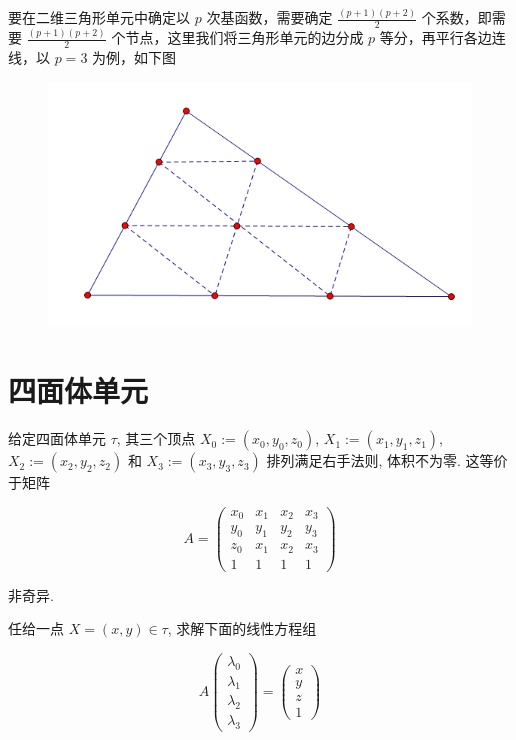 \documentclass[12pt,a4paper]{article}
\begin{document}
要在二维三角形单元中确定以 $p$ 次基函数，需要确定 $\frac{(p+1)(p+2)}{2}$ 个系数，即需要 $\frac{(p+1)(p+2)}{2}$ 个节点，这里我们将三角形单元的边分成 $p$ 等分，再平行各边连线，以 $p=3$ 为例，如下图
\begin{figure}[H]
\centering
\includegraphics[scale=0.7]{./figures/4.png}
\caption{}
\end{figure}



\section{四面体单元}
给定四面体单元 $\tau$, 其三个顶点 $X_0 :=(x_0, y_0,z_0)$, $X_1 :=(x_1,y_1,z_1)$, $X_2 :=(x_2,y_2,z_2)$ 和 $X_3 :=(x_3, y_3, z_3)$ 排列满足右手法则, 体积不为零. 这等价于矩阵

$$
A = 
\begin{pmatrix}
x_0 & x_1 & x_2 & x_3\\
y_0 & y_1 & y_2 & y_3\\
z_0 & x_1 & x_2 & x_3\\
1   & 1   & 1 & 1
\end{pmatrix}
$$

非奇异. 

任给一点 $X=(x,y)\in\tau$, 求解下面的线性方程组

$$
A 
\begin{pmatrix}
\lambda_0 \\
\lambda_1\\
\lambda_2 \\
\lambda_3
\end{pmatrix}
=\begin{pmatrix}
x \\
y\\
z \\
1  
\end{pmatrix}
$$
\end{document}
